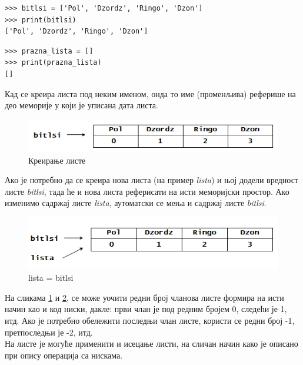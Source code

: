 \documentclass[11pt, serbianc, english, titlepage]{article}
\begin{document}
		 \begin{lstlisting}[caption = Креирање листе, label = lista]
>>> bitlsi = ['Pol', 'Dzordz', 'Ringo', 'Dzon']
>>> print(bitlsi)
['Pol', 'Dzordz', 'Ringo', 'Dzon']
		 \end{lstlisting}
		 \medskip
		 	 
		 \begin{lstlisting}[caption = Креирање празне листе, label = prazna_lista]
>>> prazna_lista = []
>>> print(prazna_lista)
[]
		 \end{lstlisting}
		 \medskip
		 
		 
		 		 Кад се креира листа под неким именом, онда то име (променљива) реферише на део меморије у који је уписана дата листа. \\
		 		 
		 \begin{figure}[here]
		 \centering
		 \includegraphics[scale = 0.50]{bitlsi1.png}
		 \caption{Креирање листе}
		 \label{slike:lista}
		 \end{figure}
		 Ако је потребно да се креира нова листа (на пример \emph{lista}) и њој додели вредност листе \emph{bitlsi}, тада ће и нова листа реферисати на исти меморијски простор. Ако изменимо садржај листе \emph{lista}, аутоматски се мења и садржај листе \emph{bitlsi}. 
		 \begin{figure}[here]
		 \centering
		 \includegraphics[scale=0.50]{bitlsi2.png}
		 \caption{lista = bitlsi }
		 \label{slike:kopiranje}
		 \end{figure}
		 На сликама \ref{slike:lista} и \ref{slike:kopiranje}, се може уочити редни број чланова листе формира на исти начин као и код ниски, дакле: први члан је под редним бројем 0, следећи је 1, итд. Ако је потребно обележити последњи члан листе, користи се редни број -1, претпоследњи је -2, итд. \\
		 На листе је могуће применити и исецање листи, на сличан начин како је описано при опису операција са нискама.\\
		 
\end{document}
